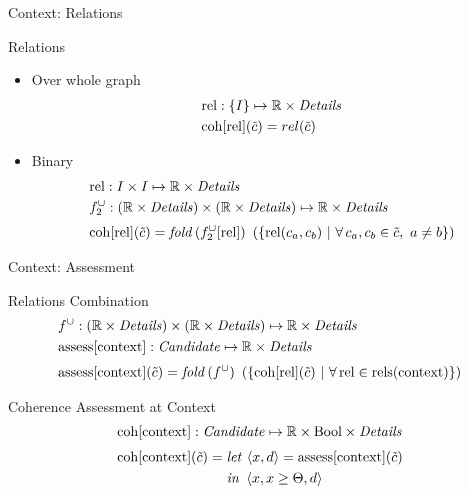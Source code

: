 \begin{frame}{Context: Relations}
  \begin{block}{Relations}
    \begin{itemize}
      \item Over whole graph
        \begin{align*}
          & \mathrm{rel}: \lbrace I \rbrace \mapsto \mathbb{R} \times \mathit{Details} \\
          & \mathrm{coh}[\mathrm{rel}](\tilde{c}) = rel(\tilde{c})
        \end{align*}
      \item Binary
        \begin{align*}
          & \mathrm{rel}: I \times I \mapsto \mathbb{R} \times \mathit{Details} \\
          & f^\cup_2: (\mathbb{R} \times \mathit{Details}) \times
                      (\mathbb{R} \times \mathit{Details})
               \mapsto \mathbb{R} \times \mathit{Details} \\[0.3em]
          & \mathrm{coh}[\mathrm{rel}](\tilde{c}) = \mathit{fold}\, (f^\cup_2[\mathrm{rel}]) ~
              \left(\lbrace \mathrm{rel}(c_a,c_b) ~|~ \forall\, c_a,c_b \in \tilde{c}
                                      , ~ a \not= b \rbrace\right)
        \end{align*}
    \end{itemize}
  \end{block}
\end{frame}

\begin{frame}{Context: Assessment}
  \begin{block}{Relations Combination}
    \begin{align*}
      & f^\cup: (\mathbb{R} \times \mathit{Details}) \times
                (\mathbb{R} \times \mathit{Details})
         \mapsto \mathbb{R} \times \mathit{Details} \\
      & \mathrm{assess}[\mathrm{context}]: \mathit{Candidate} \mapsto
                                           \mathbb{R} \times \mathit{Details}
      \\[0.3em]
      & \mathrm{assess}[\mathrm{context}](\tilde{c}) =
        \mathit{fold}\, (f^\cup) ~ \left(
        \lbrace \mathrm{coh}[\mathrm{rel}](\tilde{c}) ~|~
                \forall\, \mathrm{rel} \in \mathrm{rels}(\mathrm{context})
        \rbrace\right)
    \end{align*}
  \end{block}
  \begin{block}{Coherence Assessment at Context}
    \begin{align*}
      & \mathrm{coh}[\mathrm{context}]: \mathit{Candidate} \mapsto \mathbb{R} \times
                                \mathrm{Bool} \times \mathit{Details}
      \\[0.3em]
      & \mathrm{coh}[\mathrm{context}](\tilde{c}) =
          \begin{aligned}[t] & \mathit{let}\,  \left<x,d\right> = \mathrm{assess}[\mathrm{context}](\tilde{c})  \\& \mathit{in}~ \left<x, x \geq \Theta, d\right> \end{aligned}
    \end{align*}
  \end{block}
\end{frame}


